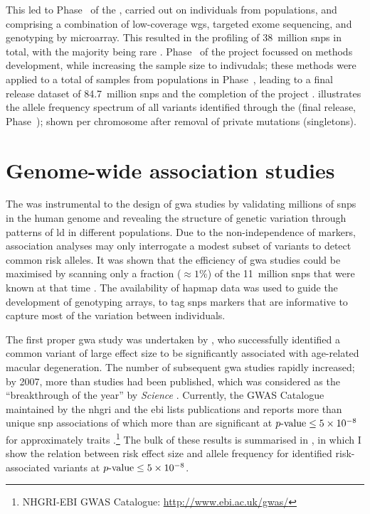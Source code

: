 This led to Phase~ of the , carried out on  individuals from  populations, and comprising a combination of low-coverage \gls{wgs}, targeted exome sequencing, and genotyping by microarray.
This resulted in the profiling of 38~million \glspl{snp} in total, with the majority being rare \citep{GenomesProjectConsortium:2012co}.
Phase~ of the project focussed on methods development, while increasing the sample size to  indivudals; these methods were applied to a total of  samples from  populations in Phase~, leading to a final release dataset of 84.7~million \glspl{snp} and the completion of the project \citep{Auton:2015gk}.
 illustrates the allele frequency spectrum of all variants identified through the  (final release, Phase~); shown per chromosome after removal of private mutations (singletons).



%
\section{Genome-wide association studies}
\label{sec:gwas_intro}
%

The  was instrumental to the design of \gls{gwa} studies by validating millions of \glspl{snp} in the human genome and revealing the structure of genetic variation through patterns of \gls{ld} in different populations.
Due to the non-independence of markers, association analyses may only interrogate a modest subset of variants to detect common risk alleles.
It was shown that the efficiency of \gls{gwa} studies could be maximised by scanning only a fraction (${\approx 1\%}$) of the 11~million \glspl{snp} that were known at that time \citep{deBakker:2005cy,Peer:2006bk}.
The availability of \gls{hapmap} data was used to guide the development of genotyping arrays, to tag \glspl{snp} markers that are informative to capture most of the variation between individuals.

%

%

The first proper \gls{gwa} study was undertaken by \citet{Klein:2005dn}, who successfully identified a common variant of large effect size to be significantly associated with age-related macular degeneration.
The number of subsequent \gls{gwa} studies rapidly increased; by 2007, more than  studies had been published, which was considered as the ``breakthrough of the year'' by \textsl{Science} \citep{Pennisi:2007cs}.
Currently, the GWAS Catalogue maintained by the \gls{nhgri} and the \gls{ebi} lists  publications and reports more than  unique \gls{snp} associations of which more than  are significant at ${\mbox{$p$-value}\leq\num{5e-8}}$ for approximately  traits \citep{burdett2016nhgri}.\footnote{NHGRI-EBI GWAS Catalogue: \url{http://www.ebi.ac.uk/gwas/} }
The bulk of these results is summarised in , in which I show the relation between risk effect size and allele frequency for identified risk-associated variants at ${\mbox{$p$-value}\leq\num{5e-8}}$.

